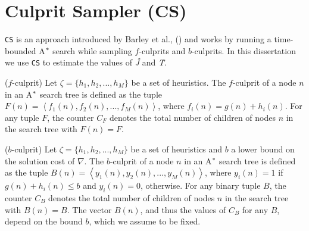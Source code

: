 \section{Culprit Sampler (CS)}
\noindent
\texttt{CS} is an approach introduced by Barley et al., (\citeyear{BarleySantiagoOver}) and works by running a time-bounded A$\sp{*}$ search while sampling $f$-culprits and $b$-culprits. In this dissertation we use \texttt{CS} to estimate the values of \textit{\^{J}} and \textit{\^{T}}.

\begin{definition}($f$-culprit)
Let $\zeta = \{h_1, h_2, ..., h_M\}$ be a set of heuristics. The $f$-culprit of a node $n$ in an A$\sp{*}$ search tree is defined as the tuple  $F(n) = \left\langle f_1(n), f_2(n), ..., f_{M}(n) \right\rangle$, where $f_i(n) = g(n) + h_i(n)$. For any tuple $F$, the counter $C_{F}$ denotes the total number of children of nodes $n$ in the search tree with $F(n)=F$.

\label{def:def_fculprits}
\end{definition}

\begin{definition}($b$-culprit)
Let $\zeta = \{h_1, h_2, ..., h_M\}$ be a set of heuristics and $b$ a lower bound on the solution cost of  $\nabla$. The $b$-culprit of a node $n$ in an A$\sp{*}$ search tree is defined as the tuple $B(n) = \left\langle y_{1}(n), y_{2}(n),...,y_{M}(n)\right\rangle$, where $y_i(n) = 1$ if $g(n) + h_i(n) \leq b$ and $y_i(n) = 0$, otherwise. For any binary tuple $B$, the counter $C_{B}$ denotes the total number of children of nodes $n$ in the search tree with $B(n)=B$. The vector $B(n)$, and thus the values of $C_{B}$ for any $B$, depend on the bound $b$, which we assume to be fixed.
\label{def:def_bculprits}
\end{definition}

